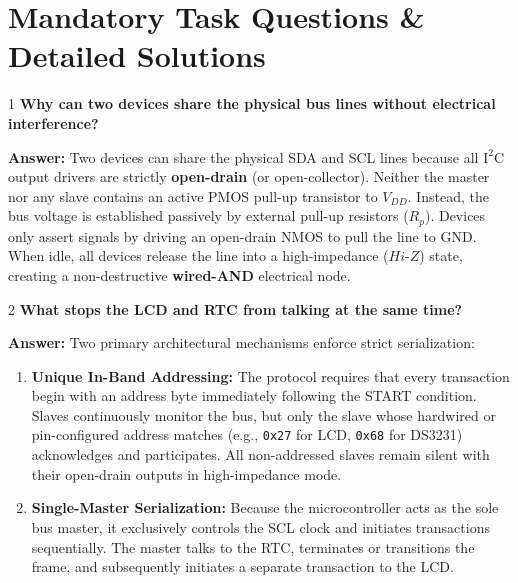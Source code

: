 \documentclass[11pt,a4paper]{article}
\begin{document}
\section{Mandatory Task Questions \& Detailed Solutions}

\begin{questionbox}{1}
\textbf{Why can two devices share the physical bus lines without electrical interference?}
\end{questionbox}
\textbf{Answer:} Two devices can share the physical SDA and SCL lines because all $\text{I}^2\text{C}$ output drivers are strictly \textbf{open-drain} (or open-collector). Neither the master nor any slave contains an active PMOS pull-up transistor to $V_{DD}$. Instead, the bus voltage is established passively by external pull-up resistors ($R_p$). Devices only assert signals by driving an open-drain NMOS to pull the line to GND. When idle, all devices release the line into a high-impedance ($Hi\text{-}Z$) state, creating a non-destructive \textbf{wired-AND} electrical node.

\begin{questionbox}{2}
\textbf{What stops the LCD and RTC from talking at the same time?}
\end{questionbox}
\textbf{Answer:} Two primary architectural mechanisms enforce strict serialization:
\begin{enumerate}
    \item \textbf{Unique In-Band Addressing:} The protocol requires that every transaction begin with an address byte immediately following the START condition. Slaves continuously monitor the bus, but only the slave whose hardwired or pin-configured address matches (e.g., \texttt{0x27} for LCD, \texttt{0x68} for DS3231) acknowledges and participates. All non-addressed slaves remain silent with their open-drain outputs in high-impedance mode.
    \item \textbf{Single-Master Serialization:} Because the microcontroller acts as the sole bus master, it exclusively controls the SCL clock and initiates transactions sequentially. The master talks to the RTC, terminates or transitions the frame, and subsequently initiates a separate transaction to the LCD.
\end{enumerate}
\end{document}
